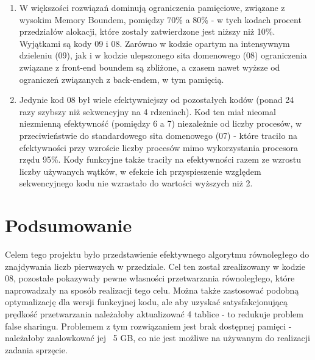 \documentclass[12pt]{article}
\begin{document}
\begin{enumerate}
	\item W większości rozwiązań dominują ograniczenia pamięciowe, związane z wysokim Memory Boundem, pomiędzy 70\% a 80\% - w tych kodach procent przedziałów alokacji, które zostały zatwierdzone jest niższy niż 10\%. Wyjątkami są kody 09 i 08. Zarówno w kodzie opartym na intensywnym dzieleniu (09), jak i w kodzie ulepszonego sita domenowego (08) ograniczenia związane z front-end boundem są zbliżone, a czasem nawet wyższe od ograniczeń związanych z back-endem, w tym pamięcią.
	
	\item Jedynie kod 08 był wiele efektywniejszy od pozostałych kodów (ponad 24 razy szybszy niż sekwencyjny na 4 rdzeniach). Kod ten miał nieomal niezmienną efektywność (pomiędzy 6 a 7) niezależnie od liczby procesów, w przeciwieństwie do standardowego sita domenowego (07) - które traciło na efektywności przy wzroście liczby procesów mimo wykorzystania procesora rzędu 95\%. Kody funkcyjne także traciły na efektywności razem ze wzrostu liczby używanych wątków, w efekcie ich przyspieszenie względem sekwencyjnego kodu nie wzrastało do wartości wyższych niż 2.
\end{enumerate}

\section{Podsumowanie}
	Celem tego projektu było przedstawienie efektywnego algorytmu równoległego do znajdywania liczb pierwszych w przedziale. Cel ten został zrealizowany w kodzie 08, pozostałe pokazywały pewne własności przetwarzania równoległego, które naprowadzały na sposób realizacji tego celu. Można także zastosować podobną optymalizację dla wersji funkcyjnej kodu, ale aby uzyskać satysfakcjonującą prędkość przetwarzania należałoby aktualizować 4 tablice - to redukuje problem false sharingu. Problemem z tym rozwiązaniem jest brak dostępnej pamięci - należałoby zaalowkować jej ~5 GB, co nie jest możliwe na używanym do realizacji zadania sprzęcie.
\end{document}
